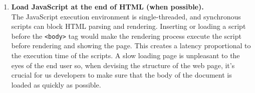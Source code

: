 \documentclass{scrbook}
\begin{document}
\begin{enumerate}
    \item 
    \parbox[t]{\linewidth}{
        \textbf{Load JavaScript at the end of HTML (when possible).} \\
        The JavaScript execution environment is single-threaded, and synchronous scripts can block HTML parsing and rendering. Inserting or loading a script before the \texttt{<body>} tag would make the rendering process execute the script before rendering and showing the page. This creates a latency proportional to the execution time of the scripts. A slow loading page is unpleasant to the eyes of the end user so, when devising the structure of the web page, it's crucial for us developers to make sure that the body of the document is loaded as quickly as possible.
    }
\end{enumerate}
\end{document}
